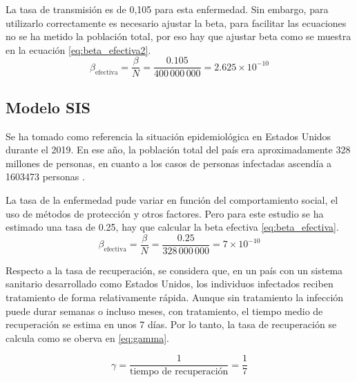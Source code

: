 La tasa de transmisión es de 0,105 \cite{shakiba2021epidemiological} para esta enfermedad. Sin embargo, para utilizarlo correctamente es necesario ajustar la beta, para facilitar las ecuaciones no se ha metido la población total, por eso hay que ajustar beta como se muestra en la ecuación \eqref{eq:beta_efectiva2}.
\begin{equation}
\beta_{\text{efectiva}} = \frac{\beta}{N} = \frac{0.105}{400\,000\,000} = 2.625 \times 10^{-10}
\label{eq:beta_efectiva2}
\end{equation}

\subsection{Modelo SIS}
Se ha tomado como referencia la situación epidemiológica en Estados Unidos durante el 2019. En ese año, la población total del país era aproximadamente 328 millones de personas, en cuanto a los casos de personas infectadas ascendía a 1603473 personas \cite{pollock2023estimated}.

La tasa de la enfermedad pude variar en función del comportamiento social, el uso de métodos de protección y otros factores. Pero para este estudio se ha estimado una tasa de 0.25, hay que calcular la beta efectiva \eqref{eq:beta_efectiva}.
\begin{equation}
\beta_{\text{efectiva}} = \frac{\beta}{N} = \frac{0.25}{328\,000\,000} = 7 \times 10^{-10}
\label{eq:beta_efectiva}
\end{equation}


Respecto a la tasa de recuperación, se considera que, en un país con un sistema sanitario desarrollado como Estados Unidos, los individuos infectados reciben tratamiento de forma relativamente rápida. Aunque sin tratamiento la infección puede durar semanas o incluso meses, con tratamiento, el tiempo medio de recuperación se estima en unos 7 días. Por lo tanto, la tasa de recuperación se calcula como se oberva en \eqref{eq:gamma}.

\begin{equation}
\gamma = \frac{1}{\text{tiempo de recuperación}} = \frac{1}{7}
\label{eq:gamma}
\end{equation}


